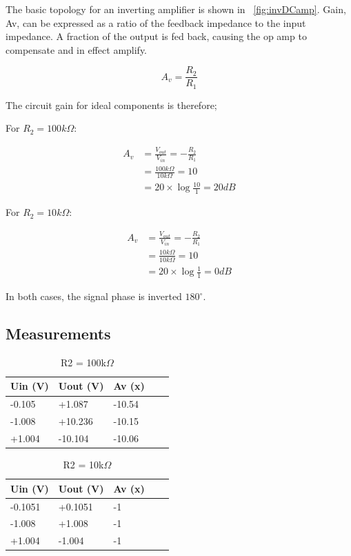 \documentclass[]{article}
\begin{document}
The basic topology for an inverting amplifier is shown in ~\ref{fig:invDCamp}.
Gain, Av, can be expressed as a ratio of the feedback impedance to the
input impedance. A fraction of the output is fed back, causing the op
amp to compensate and in effect amplify.

\begin{equation}
A_v = \frac{R_2}{R_1}
\end{equation}

The circuit gain for ideal components is therefore;

For $R_2 = 100k\Omega$:

\begin{align} 
A_v     &= \frac{V_{out}}{V_{in}} = -\frac{R_2}{R_1}\\
        &= \frac{100k\Omega}{10k\Omega} = 10\\
        &= 20 \times \log{\frac{10}{1}} = 20dB  
\end{align}

For $R_2 = 10k\Omega$:

\begin{align} 
A_v     &= \frac{V_{out}}{V_{in}} = -\frac{R_2}{R_1}\\
        &= \frac{10k\Omega}{10k\Omega} = 10\\
        &= 20 \times \log{\frac{1}{1}} = 0dB  
\end{align}

In both cases, the signal phase is inverted $180^\circ$.

\subsection{Measurements}\label{measurements}
\begin{table}[h]
  \centering
  \begin{tabular}{@{}lllll@{}}
    \toprule
    Uin (V) & Uout (V) & Av (x) &  &  \\ \midrule
    -0.105 & +1.087  & -10.54     &  &  \\
    -1.008  & +10.236   & -10.15     &  &  \\
    +1.004  & -10.104   & -10.06     &  &  \\ \bottomrule
  \end{tabular}
  \caption{R2 = 100k$\Omega$}
  \label{invDCtable1}
\end{table}

\begin{table}[h]
  \centering
  \begin{tabular}{@{}lllll@{}}
    \toprule
    Uin (V) & Uout (V) & Av (x) &  &  \\ \midrule
    -0.1051 & +0.1051  & -1     &  &  \\
    -1.008  & +1.008   & -1     &  &  \\
    +1.004  & -1.004   & -1     &  &  \\ \bottomrule
  \end{tabular}
  \caption{R2 = 10k$\Omega$}
  \label{invDCtable2}
\end{table}
\end{document}
